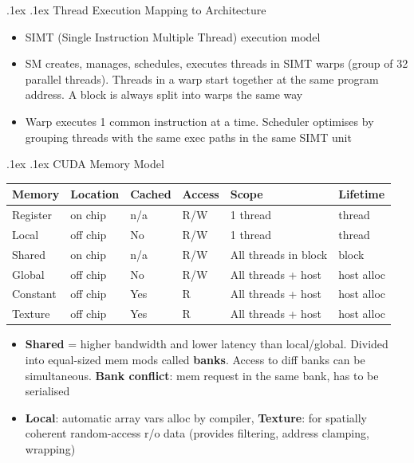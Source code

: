 \documentclass[10pt,landscape,a4paper]{article}
\makeatletter
\renewcommand{\subsection}{\@startsection{subsection}{1}{0mm}%
  {.1ex}%
  {.1ex}%
{\sffamily\bfseries}}
\makeatother
\begin{document}
\begin{multicols*}{4}
\subsection{Thread Execution Mapping to Architecture}
\begin{itemize}
  \item SIMT (Single Instruction Multiple Thread) execution model
  \item SM creates, manages, schedules, executes threads in SIMT warps (group of 32 parallel threads). Threads in a warp start together at the same program address. A block is always split into warps the same way
  \item Warp executes 1 common instruction at a time. Scheduler optimises by grouping threads with the same exec paths in the same SIMT unit
\end{itemize}
\subsection{CUDA Memory Model}
\begin{tabularx}{\columnwidth}{l|l|l|l|l|l}
  \textbf{Memory} & \textbf{Location} & \textbf{Cached} & \textbf{Access} & \textbf{Scope} & \textbf{Lifetime} \\ \hline
  Register & on chip & n/a & R/W & 1 thread & thread \\ \hline
  Local & off chip & No & R/W & 1 thread & thread \\ \hline
  Shared & on chip & n/a & R/W & All threads in block & block \\ \hline
  Global & off chip & No & R/W & All threads + host & host alloc \\ \hline
  Constant & off chip & Yes & R & All threads + host & host alloc \\ \hline
  Texture & off chip & Yes & R & All threads + host & host alloc \\
\end{tabularx}
\begin{itemize}
  \item \textbf{Shared} = higher bandwidth and lower latency than local/global. Divided into equal-sized mem mods called \textbf{banks}. Access to diff banks can be simultaneous. \textbf{Bank conflict}: mem request in the same bank, has to be serialised
  \item \textbf{Local}: automatic array vars alloc by compiler, \textbf{Texture}: for spatially coherent random-access r/o data (provides filtering, address clamping, wrapping)
\end{itemize}

\end{multicols*}
\end{document}
